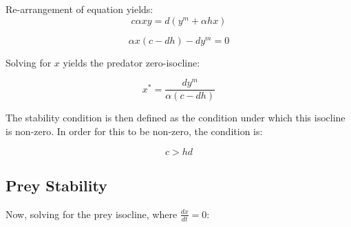 \documentclass{article}
\begin{document}
Re-arrangement of equation yields:
$$c\alpha xy = d(y^m + \alpha hx)$$

$$\alpha x(c-dh) - dy^m = 0$$

Solving for $x$ yields the predator zero-isocline: 

$$x^* = \frac{dy^m}{\alpha (c - dh)}$$

The stability condition is then defined as the condition under which this isocline is non-zero. In order for this to be non-zero, the condition is:

$$c > hd $$

\subsection{Prey Stability}
Now, solving for the prey isocline, where $\frac{dx}{dt} = 0$:
\end{document}
